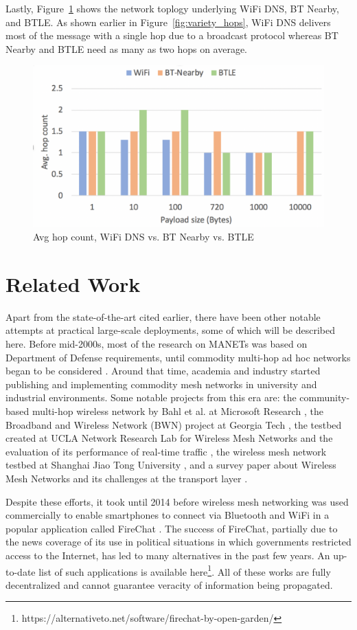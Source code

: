 \documentclass[conference]{IEEEtran}
\begin{document}
Lastly, Figure~\ref{fig:hop} shows the network toplogy underlying WiFi
DNS, BT Nearby, and BTLE. As shown earlier in
Figure~\ref{fig:variety_hops}, WiFi DNS delivers most of the message
with a single hop due to a broadcast protocol whereas BT Nearby and
BTLE need as many as two hops on average.
%
\begin{figure}[htbp]
\centerline{\includegraphics[width=0.8\columnwidth]{figs/hops}}
\caption{Avg hop count, WiFi DNS vs. BT Nearby vs. BTLE}
\label{fig:hop}
\end{figure}
%
%
\section{Related Work}
\label{sec:related}
%
Apart from the state-of-the-art cited earlier, there have been other
notable attempts at practical large-scale deployments, some of which
will be described here. Before mid-2000s, most of the research on
MANETs was based on Department of Defense requirements, until
commodity multi-hop ad hoc networks began to be considered
\cite{bruno-mesh-2005}. Around that time, academia and industry
started publishing and implementing commodity mesh networks in
university and industrial environments. Some notable projects from
this era are: the community-based multi-hop wireless network by Bahl
et al. at Microsoft Research \cite{microsoft-mesh}, the Broadband and
Wireless Network (BWN) project at Georgia Tech \cite{gatech-mesh}, the
testbed created at UCLA Network Research Lab for Wireless Mesh
Networks and the evaluation of its performance of real-time traffic
\cite{chavoutier-2007}, the wireless mesh network testbed at Shanghai
Jiao Tong University \cite{wu-mesh-2010}, and a survey paper about
Wireless Mesh Networks and its challenges at the transport layer
\cite{saha-mesh-2014}.

Despite these efforts, it took until 2014 before wireless mesh
networking was used commercially to enable smartphones to connect via
Bluetooth and WiFi in a popular application called FireChat
\cite{firechat}. The success of FireChat, partially due to the news
coverage of its use in political situations in which governments
restricted access to the Internet, has led to many alternatives in the
past few years. An up-to-date list of such applications is available
here\footnote{https://alternativeto.net/software/firechat-by-open-garden/}.
All of these works are fully decentralized and cannot guarantee
veracity of information being propagated.
\end{document}
